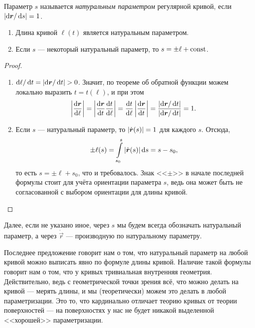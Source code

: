 \begin{definition}
	Параметр $s$ называется \textit{натуральным параметром} регулярной кривой, если $\left\lvert\mathop{}\!\mathrm{d}\boldsymbol{r} / \mathop{}\!\mathrm{d} s\right\rvert = 1$.
\end{definition}

\begin{proposition} \label{proposition:LengthParameter}
	\begin{enumerate}[nolistsep, label=(\arabic*)]
		\item Длина кривой $\ell(t)$ является натуральным параметром.
		\item Если $s$ --- некоторый натуральный параметр, то $s = \pm \ell + \mathrm{const}$.
	\end{enumerate}
\end{proposition}

\begin{proof}
	\begin{enumerate}[nolistsep, label=(\arabic*)]
		\item $\mathop{}\!\mathrm{d}\ell / \mathop{}\!\mathrm{d} t = \left\lvert\mathop{}\!\mathrm{d}\boldsymbol{r} / \mathop{}\!\mathrm{d} t\right\rvert > 0$. Значит, по теореме об обратной функции можем локально выразить $t = t(\ell)$, и при этом
			\[
				\abs{\frac{\d\vec{r}}{\d\ell}} = \abs{\frac{\d\vec{r}}{\d t}\frac{\d t}{\d\ell}} = \frac{\d t}{\d\ell}\abs{\frac{\d\vec{r}}{\d t}} = \frac{\abs{\d\vec{r} / \d t}}{\abs{\d\vec{r} / \d t}} = 1.
			\]
		\item Если $s$ --- натуральный параметр, то $\left\lvert\dot{\boldsymbol{r}}(s)\right\rvert = 1$ для каждого $s$. Отсюда,
			\[
				\pm\ell(s) = \int\limits_{s_0}^s\left\lvert\dot{\boldsymbol{r}}(s)\right\rvert\mathop{}\!\mathrm{d} s = s - s_0,
			\]
			то есть $s = \pm\ell + s_0$, что и требовалось. Знак <<$\pm$>> в начале последней формулы стоит для учёта ориентации параметра $s$, ведь она может быть не согласованной с выбором ориентации для длины кривой.
	\end{enumerate}
\end{proof}

Далее, если не указано иное, через $s$ мы будем всегда обозначать натуральный параметр, а через $\dot{\vec{r}}$ --- производную по натуральному параметру\footnotemark{}.


Последнее предложение говорит нам о том, что натуральный параметр на любой кривой можно выписать явно по формуле длины кривой. Наличие такой формулы говорит нам о том, что у кривых тривиальная внутренняя геометрия. Действительно, ведь с геометрической точки зрения всё, что можно делать на кривой --- мерять длины, и мы (теоретически\footnotemark) можем это делать в любой параметризации. Это то, что кардинально отличает теорию кривых от теории поверхностей --- на поверхностях у нас не будет никакой выделенной <<хорошей>> параметризации.

